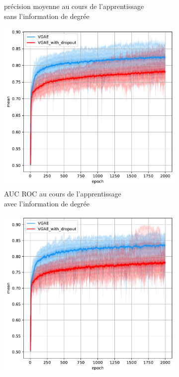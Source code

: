 \documentclass{article}
\begin{document}
\begin{figure}[H]
\begin{subfigure}{0.45\textwidth}
      \centering
      \caption{précision moyenne au cours de l'apprentissage\\ sans l'information de degrée}
    \end{subfigure}
    
    \begin{subfigure}{0.45\textwidth}
      \includegraphics[width=\textwidth]{graphics/AUCs_degree_dropout_cinf.svg.pdf}
      \centering
      \caption{AUC ROC au cours de l'apprentissage\\ avec l'information de degrée}
    \end{subfigure}
    \begin{subfigure}{0.45\textwidth}
      \includegraphics[width=\textwidth]{graphics/AUCs_no_degree_dropout_cinf.svg.pdf}

\end{subfigure}
\end{figure}
\end{document}
